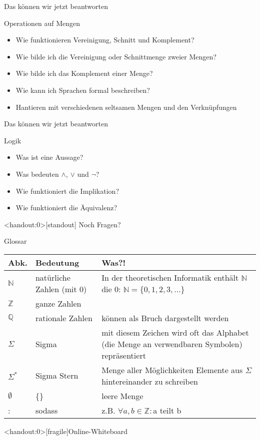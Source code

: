 \begin{frame}[fragile]{Das können wir jetzt beantworten}
    \begin{alertblock}{Operationen auf Mengen}
    \begin{itemize}
        \item Wie funktionieren Vereinigung, Schnitt und Komplement?
        \item Wie bilde ich die Vereinigung oder Schnittmenge zweier Mengen?
        \item Wie bilde ich das Komplement einer Menge?
        \item Wie kann ich Sprachen formal beschreiben?
        \item Hantieren mit verschiedenen seltsamen Mengen und den Verknüpfungen
    \end{itemize}
    \end{alertblock}
\end{frame}

\begin{frame}[fragile]{Das können wir jetzt beantworten}
	\begin{alertblock}{Logik}
		\begin{itemize}
			\item Was ist eine Aussage?
			\item Was bedeuten $\wedge$, $\vee$ und $\neg$?
			\item Wie funktioniert die Implikation?
			\item Wie funktioniert die Äquivalenz?
		\end{itemize}
	\end{alertblock}
\end{frame}

\begin{frame}<handout:0>[standout]
  Noch Fragen?
\end{frame}

\begin{frame}[fragile]{Glossar}
    \small
    \begin{tabular}{p{} p{} p{}}
    \toprule
    Abk.&Bedeutung&Was?!\\
    \midrule
        $\mathbb{N}$&natürliche Zahlen (mit 0)&In der theoretischen Informatik enthält $\mathbb{N}$ die 0: $\mathbb{N}=\{0,1,2,3,\dots\}$\\
        $\mathbb{Z}$&ganze Zahlen&\\
        $\mathbb{Q}$&rationale Zahlen&können als Bruch dargestellt werden\\
        $\Sigma$ & Sigma& mit diesem Zeichen wird oft das Alphabet (die Menge an verwendbaren Symbolen) repräsentiert\\
        $\Sigma^\ast$&Sigma Stern&Menge aller Möglichkeiten Elemente aus $\Sigma$ hintereinander zu schreiben\\
        $\emptyset$&\{\}&leere Menge\\
        :&sodass&z.B. $\forall a,b\in\mathbb{Z}:$a teilt b\\
    \bottomrule
    \end{tabular}
\end{frame}

\appendix
\begin{frame}<handout:0>[fragile]{Online-Whiteboard}
	\phantom{text}
\end{frame}

